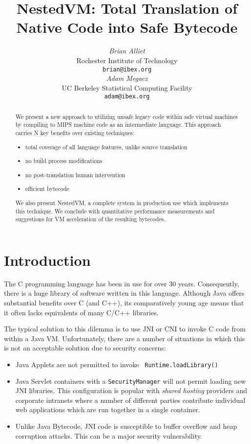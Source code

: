 \documentclass{acmconf}
\title{\textbf{\textsf{
NestedVM: Total Translation of Native Code into Safe Bytecode
}}}
\date{}
\author{\begin{tabular}{@{}c@{}}
        {\em {Brian Alliet}} \\
        {Rochester Institute of Technology}\\
        {\tt brian@ibex.org}
   \end{tabular}\hskip 1in\begin{tabular}{@{}c@{}}
        {\em {Adam Megacz}} \\
        {UC Berkeley Statistical Computing Facility} \\
        {\tt adam@ibex.org}
\end{tabular}}
\begin{document}
\maketitle

\begin{abstract}

We present a new approach to utilizing unsafe legacy code
within safe virtual machines by compiling to MIPS machine code as an
intermediate language.  This approach carries N key benefits over
existing techniques:

\begin{itemize}
\item total coverage of all language features, unlike source translation
\item no build process modifications
\item no post-translation human intervention
\item efficient bytecode
\end{itemize}

We also present NestedVM, a complete system in production use which
implements this technique.  We conclude with quantitative performance
measurements and suggestions for VM acceleration of the resulting
bytecodes.


\end{abstract}

\section{Introduction}

The C programming language \cite{KR} has been in use for over 30
years.  Consequently, there is a huge library of software written in
this language.  Although Java offers substantial benefits \cite{} over
C (and C++), its comparatively young age means that it often lacks
equivalents of many C/C++ libraries.

The typical solution to this dilemma is to use JNI \cite{} or CNI
\cite{} to invoke C code from within a Java VM.  Unfortunately, there
are a number of situations in which this is not an acceptable
solution due to security concerns:

\begin{itemize}

\item Java Applets are not permitted to invoke {\tt
      Runtime.loadLibrary()}

\item Java Servlet containers with a {\tt SecurityManager} will not
      permit loading new JNI libraries.  This configuration is popular
      with {\it shared hosting} providers and corporate intranets
      where a number of different parties contribute individual web
      applications which are run together in a single container.

\item Unlike Java Bytecode, JNI code is susceptible to buffer overflow
      and heap corruption attacks.  This can be a major security
      vulnerability.

\end{itemize}
\end{document}
